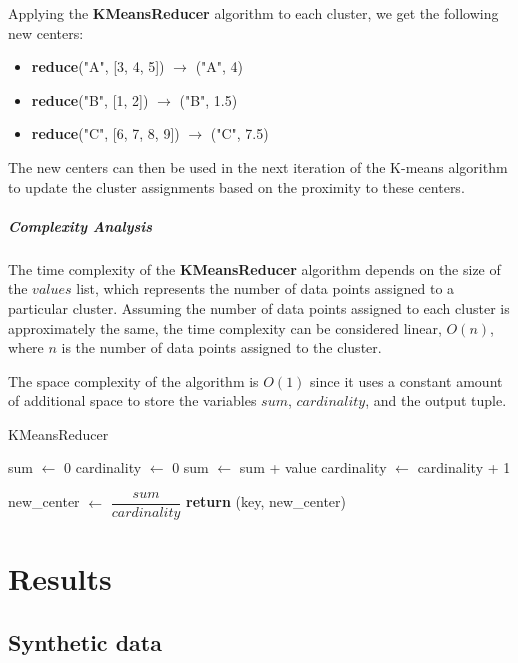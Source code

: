 \documentclass[parskip=full]{report}
\begin{document}
Applying the \textbf{KMeansReducer} algorithm to each cluster, we get the following new centers:

\begin{itemize}
	\item \textbf{reduce}("A", [3, 4, 5]) $\rightarrow$ ("A", 4)
	\item \textbf{reduce}("B", [1, 2]) $\rightarrow$ ("B", 1.5)
	\item \textbf{reduce}("C", [6, 7, 8, 9]) $\rightarrow$ ("C", 7.5)
\end{itemize}

The new centers can then be used in the next iteration of the K-means algorithm to update the cluster assignments based on the proximity to these centers.

\paragraph{Complexity Analysis}

The time complexity of the \textbf{KMeansReducer} algorithm depends on the size of the $values$ list, which represents the number of data points assigned to a particular cluster. Assuming the number of data points assigned to each cluster is approximately the same, the time complexity can be considered linear, $O(n)$, where $n$ is the number of data points assigned to the cluster.

The space complexity of the algorithm is $O(1)$ since it uses a constant amount of additional space to store the variables $sum$, $cardinality$, and the output tuple.


\begin{algorithm}[H]
	\caption{KMeansReducer}\label{algo:kmeans-reducer}
	\begin{algorithmic}[1]
		\State sum $\gets$ 0
		\State cardinality $\gets$ 0
		\State sum $\gets$ sum + value
		\State cardinality $\gets$ cardinality + 1
		\EndFor

		\State new\_center $\gets$  $\dfrac{sum}{cardinality}$
		\State \textbf{return} (key, new\_center)
		\EndProcedure
	\end{algorithmic}
\end{algorithm}

\chapter{Results}

\section{Synthetic data}
\end{document}
